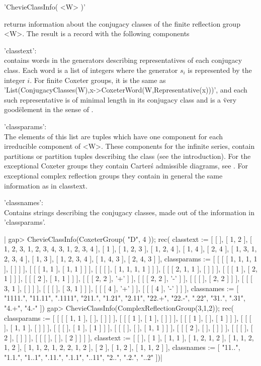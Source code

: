 
'ChevieClassInfo( <W> )'

returns  information about the  conjugacy classes of  the finite reflection
group <W>. The result is a record with the following components\:\

'classtext':\\ contains words in the generators  describing representatives
     of  each conjugacy class.  Each word is  a list of  integers where the
     generator  $s_i$ is represented by the integer $i$. For finite Coxeter
     groups, it is the same as
     'List(ConjugacyClasses(W),x->CoxeterWord(W,Representative(x)))',   and
     each  such representative is of minimal  length in its conjugacy class
     and is a \"very good\" element in the sense of \cite{GM97}.

'classparams':\\   The elements of this list are tuples which have one
     component  for each irreducible component of <W>. These components for
     the infinite series, contain partitions or partition tuples describing
     the  class (see the introduction).  For the exceptional Coxeter groups
     they  contain  Carter\'s  admissible  diagrams,  see \cite{Car72}. For
     exceptional complex reflection groups they contain in general the same
     information as in classtext.

'classnames':\\ Contains strings describing  the conjugacy classes, made
     out of the information in 'classparams'.

|    gap> ChevieClassInfo(CoxeterGroup( "D", 4 ));
    rec(
      classtext :=
       [ [  ], [ 1, 2 ], [ 1, 2, 3, 1, 2, 3, 4, 3, 1, 2, 3, 4 ], [ 1 ],
          [ 1, 2, 3 ], [ 1, 2, 4 ], [ 1, 4 ], [ 2, 4 ],
          [ 1, 3, 1, 2, 3, 4 ], [ 1, 3 ], [ 1, 2, 3, 4 ], [ 1, 4, 3 ],
          [ 2, 4, 3 ] ],
      classparams :=
       [ [ [ [ 1, 1, 1, 1 ], [  ] ] ], [ [ [ 1, 1 ], [ 1, 1 ] ] ],
          [ [ [  ], [ 1, 1, 1, 1 ] ] ], [ [ [ 2, 1, 1 ], [  ] ] ],
          [ [ [ 1 ], [ 2, 1 ] ] ], [ [ [ 2 ], [ 1, 1 ] ] ],
          [ [ [ 2, 2 ], '+' ] ], [ [ [ 2, 2 ], '-' ] ],
          [ [ [  ], [ 2, 2 ] ] ], [ [ [ 3, 1 ], [  ] ] ],
          [ [ [  ], [ 3, 1 ] ] ], [ [ [ 4 ], '+' ] ], [ [ [ 4 ], '-' ] ] ],
      classnames := [ "1111.", "11.11", ".1111", "211.", "1.21", "2.11",
          "22.+", "22.-", ".22", "31.", ".31", "4.+", "4.-" ])
    gap> ChevieClassInfo(ComplexReflectionGroup(3,1,2));
    rec(
      classparams :=
       [ [ [ [ 1, 1 ], [  ], [  ] ] ], [ [ [ 1 ], [ 1 ], [  ] ] ],
          [ [ [ 1 ], [  ], [ 1 ] ] ], [ [ [  ], [ 1, 1 ], [  ] ] ],
          [ [ [  ], [ 1 ], [ 1 ] ] ], [ [ [  ], [  ], [ 1, 1 ] ] ],
          [ [ [ 2 ], [  ], [  ] ] ], [ [ [  ], [ 2 ], [  ] ] ],
          [ [ [  ], [  ], [ 2 ] ] ] ],
      classtext :=
       [ [  ], [ 1 ], [ 1, 1 ], [ 1, 2, 1, 2 ], [ 1, 1, 2, 1, 2 ],
          [ 1, 1, 2, 1, 2, 2, 1, 2 ], [ 2 ], [ 1, 2 ], [ 1, 1, 2 ] ],
      classnames := [ "11..", "1.1.", "1..1", ".11.", ".1.1", "..11",
          "2..", ".2.", "..2" ])|

